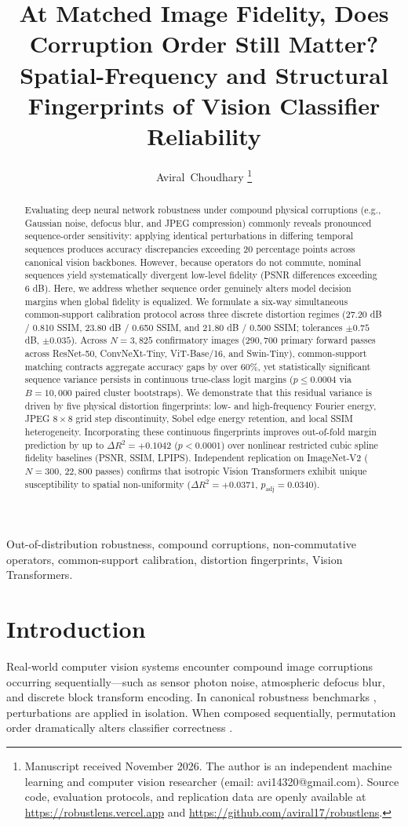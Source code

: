 \documentclass[10pt,journal,compsoc]{IEEEtran}
\title{At Matched Image Fidelity, Does Corruption Order Still Matter? Spatial-Frequency and Structural Fingerprints of Vision Classifier Reliability}
\author{Aviral~Choudhary%
\thanks{Manuscript received November 2026. The author is an independent machine learning and computer vision researcher (email: avi14320@gmail.com). Source code, evaluation protocols, and replication data are openly available at \url{https://robustlens.vercel.app} and \url{https://github.com/aviral17/robustlens}.}}
\begin{document}
\maketitle

\begin{abstract}
Evaluating deep neural network robustness under compound physical corruptions (e.g., Gaussian noise, defocus blur, and JPEG compression) commonly reveals pronounced sequence-order sensitivity: applying identical perturbations in differing temporal sequences produces accuracy discrepancies exceeding 20 percentage points across canonical vision backbones. However, because operators do not commute, nominal sequences yield systematically divergent low-level fidelity (PSNR differences exceeding 6 dB). Here, we address whether sequence order genuinely alters model decision margins when global fidelity is equalized. We formulate a six-way simultaneous common-support calibration protocol across three discrete distortion regimes (27.20 dB / 0.810 SSIM, 23.80 dB / 0.650 SSIM, and 21.80 dB / 0.500 SSIM; tolerances $\pm 0.75$ dB, $\pm 0.035$). Across $N = 3{,}825$ confirmatory images ($290{,}700$ primary forward passes across ResNet-50, ConvNeXt-Tiny, ViT-Base/16, and Swin-Tiny), common-support matching contracts aggregate accuracy gaps by over 60\%, yet statistically significant sequence variance persists in continuous true-class logit margins ($p \le 0.0004$ via $B = 10{,}000$ paired cluster bootstraps). We demonstrate that this residual variance is driven by five physical distortion fingerprints: low- and high-frequency Fourier energy, JPEG $8 \times 8$ grid step discontinuity, Sobel edge energy retention, and local SSIM heterogeneity. Incorporating these continuous fingerprints improves out-of-fold margin prediction by up to $\Delta R^2 = +0.1042$ ($p < 0.0001$) over nonlinear restricted cubic spline fidelity baselines (PSNR, SSIM, LPIPS). Independent replication on ImageNet-V2 ($N = 300$, $22{,}800$ passes) confirms that isotropic Vision Transformers exhibit unique susceptibility to spatial non-uniformity ($\Delta R^2 = +0.0371$, $p_{\text{adj}} = 0.0340$).
\end{abstract}

\begin{IEEEkeywords}
Out-of-distribution robustness, compound corruptions, non-commutative operators, common-support calibration, distortion fingerprints, Vision Transformers.
\end{IEEEkeywords}

\section{Introduction}
Real-world computer vision systems encounter compound image corruptions occurring sequentially—such as sensor photon noise, atmospheric defocus blur, and discrete block transform encoding. In canonical robustness benchmarks \cite{hendrycks2019robustness}, perturbations are applied in isolation. When composed sequentially, permutation order dramatically alters classifier correctness \cite{goyal2022dual, li2025rbench}.
\end{document}
